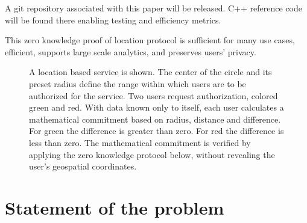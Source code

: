 \documentclass{article}
\begin{document}
A git repository associated with this paper will be released. C++ reference code will be found there enabling testing and efficiency metrics. 

This zero knowledge proof of location protocol is sufficient for many use cases, efficient, supports large scale analytics, and preserves users' privacy.

\begin{figure}
  \centering
  \def\svgwidth{\columnwidth}
  
\caption{A location based service is shown.
The center of the circle and its preset radius define the range within which users are to be authorized for the service.
Two users request authorization, colored green and red.
With data known only to itself, each user calculates a mathematical commitment based on radius, distance and difference.
For green the difference is greater than zero.
For red the difference is less than zero.
The mathematical commitment is verified by applying the zero knowledge protocol below, without revealing the user's geospatial coordinates.}
\label{fig-rangeproof}
\end{figure}

\section{Statement of the problem}
\end{document}
